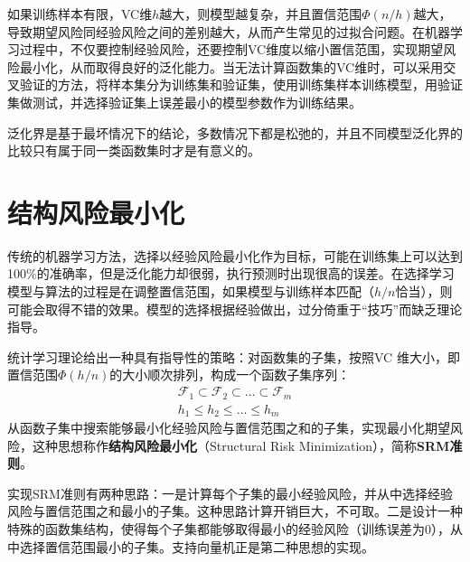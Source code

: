 如果训练样本有限，VC维$h$越大，则模型越复杂，并且置信范围$\varPhi(n/h)$越大，导致期望风险同经验风险之间的差别越大，从而产生常见的过拟合问题。在机器学习过程中，不仅要控制经验风险，还要控制VC维度以缩小置信范围，实现期望风险最小化，从而取得良好的泛化能力。当无法计算函数集的VC维时，可以采用交叉验证的方法，将样本集分为训练集和验证集，使用训练集样本训练模型，用验证集做测试，并选择验证集上误差最小的模型参数作为训练结果。

泛化界是基于最坏情况下的结论，多数情况下都是松弛的，并且不同模型泛化界的比较只有属于同一类函数集时才是有意义的。

\section{结构风险最小化}
传统的机器学习方法，选择以经验风险最小化作为目标，可能在训练集上可以达到100\%的准确率，但是泛化能力却很弱，执行预测时出现很高的误差。在选择学习模型与算法的过程是在调整置信范围，如果模型与训练样本匹配（$h/n$恰当），则可能会取得不错的效果。模型的选择根据经验做出，过分倚重于“技巧”而缺乏理论指导。

统计学习理论给出一种具有指导性的策略：对函数集的子集，按照VC 维大小，即置信范围$\varPhi(h/n)$的大小顺次排列，构成一个函数子集序列：
\begin{equation}\label{eq:funtionalsubset}
    \begin{array}{l}
      \mathcal{F}_1 \subset \mathcal{F}_2 \subset \ldots \subset \mathcal{F}_m \\
      h_1 \le h_2 \le \ldots \le h_m
    \end{array}
\end{equation}
从函数子集中搜索能够最小化经验风险与置信范围之和的子集，实现最小化期望风险，这种思想称作\textbf{结构风险最小化}（Structural Risk Minimization），简称\textbf{SRM准则}。

实现SRM准则有两种思路：一是计算每个子集的最小经验风险，并从中选择经验风险与置信范围之和最小的子集。这种思路计算开销巨大，不可取。二是设计一种特殊的函数集结构，使得每个子集都能够取得最小的经验风险（训练误差为$0$），从中选择置信范围最小的子集。支持向量机正是第二种思想的实现。


